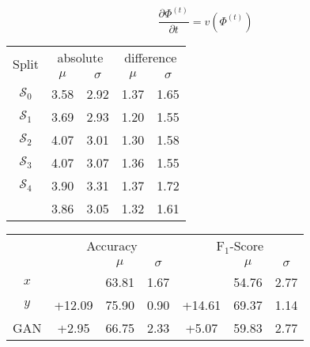 %

\pagebreak

\pagebreak

\pagebreak

\pagebreak

\pagebreak

\pagebreak

\pagebreak

\pagebreak

\pagebreak

\pagebreak

\pagebreak

\pagebreak


\pagebreak

\begin{equation} \label{eq:voxODE}
	\frac{\partial \Phi^{(t)}}{\partial t} = v(\Phi^{(t)})
\end{equation}


\pagebreak

\begin{table}[h]
	\begin{center}
		\begin{tabular}{c c c | c c}
			\toprule
			\multirow{2}{*}{Split} &
			\multicolumn{2}{c}{absolute} & 
			\multicolumn{2}{c}{difference} \\ 
			\cmidrule(lr){2-3}
			\cmidrule(lr){4-5}
			 & $\mu$ & $\sigma$ & $\mu$ & $\sigma$ \\ 
			\cmidrule(lr){1-5}
			$\mathcal{S}_0$ & 3.58 & 2.92 & 1.37 & 1.65 \\
			$\mathcal{S}_1$ & 3.69 & 2.93 & 1.20 & 1.55 \\
			$\mathcal{S}_2$ & 4.07 & 3.01 & 1.30 & 1.58 \\
			$\mathcal{S}_3$ & 4.07 & 3.07 & 1.36 & 1.55 \\
			$\mathcal{S}_4$ & 3.90 & 3.31 & 1.37 & 1.72 \\
			\cmidrule(lr){1-5}
					& 3.86 & 3.05 & 1.32 & 1.61 \\
			\bottomrule
		\end{tabular}
	\end{center}
\end{table}

\pagebreak
\begin{table}[h]
	\begin{center}
		\begin{tabular}{c c c c c c c}
			\toprule
			\multirow{2}{*}{} &
			\multicolumn{3}{c}{Accuracy} &
			\multicolumn{3}{c}{$\text{F}_1$-Score} \\
			\cmidrule(lr){2-4}
			\cmidrule(lr){5-7}
			 & & $\mu$ & $\sigma$ & & $\mu$ & $\sigma$ \\
			\cmidrule(lr){1-7}
			$x$\hphantom{*} &        & 63.81 & 1.67 &         & 54.76 & 2.77 \\
			$y$\hphantom{*} & +12.09 & 75.90 & 0.90 &  +14.61 & 69.37 & 1.14 \\
			\cmidrule(lr){1-7}                         
			GAN             & +2.95  & 66.75 & 2.33 &  +5.07  & 59.83 & 2.77 \\
			\bottomrule
		\end{tabular}
	
	\end{center}
\end{table}

